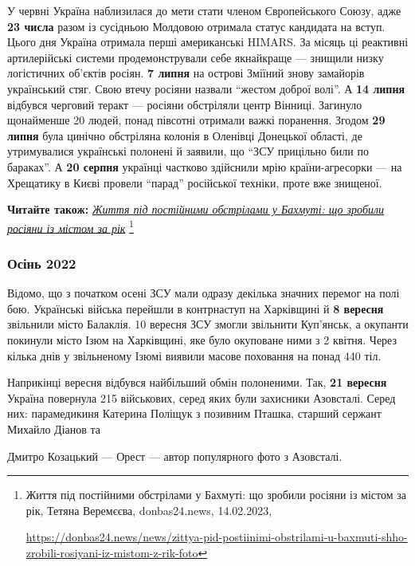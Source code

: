 У червні Україна наблизилася до мети стати членом Європейського Союзу, адже \textbf{23
числа} разом із сусідньою Молдовою отримала статус кандидата на вступ. Цього дня
Україна отримала перші американські HIMARS. За місяць ці реактивні
артилерійські системи продемонстрували себе якнайкраще — знищили низку
логістичних об'єктів росіян. \textbf{7 липня} на острові Зміїний знову замайорів
український стяг. Свою втечу росіяни назвали \enquote{жестом доброї волі}. А \textbf{14 липня}
відбувся черговий теракт — росіяни обстріляли центр Вінниці. Загинуло
щонайменше 20 людей, понад півсотні отримали важкі поранення. Згодом \textbf{29 липня}
була цинічно обстріляна колонія в Оленівці Донецької області, де утримувалися
українські полонені й заявили, що \enquote{ЗСУ прицільно били по бараках}. А \textbf{20 серпня}
українці частково здійснили мрію країни-агресорки — на Хрещатику в Києві
провели \enquote{парад} російської техніки, проте вже знищеної.


\textbf{Читайте також:} \href{https://donbas24.news/news/zittya-pid-postiinimi-obstrilami-u-baxmuti-shho-zrobili-rosiyani-iz-mistom-z-rik-foto}{\emph{Життя під постійними обстрілами у Бахмуті: що зробили росіяни із містом за рік}}%
\footnote{Життя під постійними обстрілами у Бахмуті: що зробили росіяни із містом за рік, Тетяна Веремєєва, donbas24.news, 14.02.2023, \par%
\url{https://donbas24.news/news/zittya-pid-postiinimi-obstrilami-u-baxmuti-shho-zrobili-rosiyani-iz-mistom-z-rik-foto}%
}

\subsubsection{Осінь 2022}

Відомо, що з початком осені ЗСУ мали одразу декілька значних перемог на полі
бою. Українські війська перейшли в контрнаступ на Харківщині й \textbf{8 вересня}
звільнили місто Балаклія. 10 вересня ЗСУ змогли звільнити Куп'янськ, а окупанти
покинули місто Ізюм на Харківщині, яке було окуповане ними з 2 квітня. Через
кілька днів у звільненому Ізюмі виявили масове поховання на понад 440 тіл.

Наприкінці вересня відбувся найбільший обмін полоненими. Так, \textbf{21 вересня}
Україна повернула 215 військових, серед яких були захисники Азовсталі. Серед
них: парамедикиня Катерина Поліщук з позивним Пташка, старший сержант Михайло
Діанов та\par\noindent Дмитро Козацький — Орест — автор популярного фото з Азовсталі.

